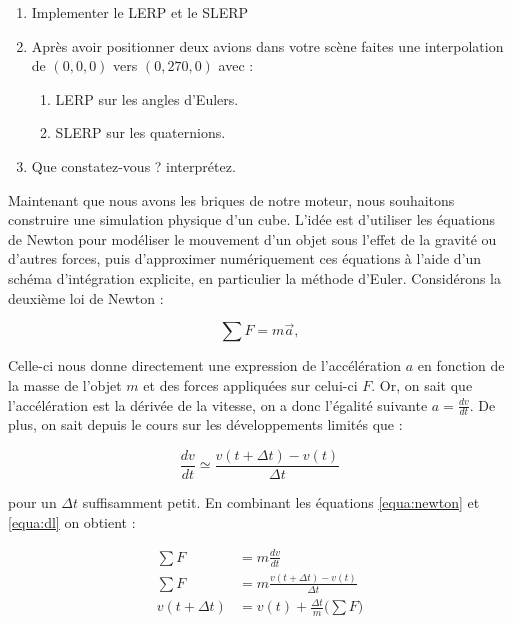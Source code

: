\documentclass[a4paper,12pt]{article}
\begin{document}

\begin{enumerate}
    \item Implementer le LERP et le SLERP
    \item Après avoir positionner deux avions dans votre scène faites une interpolation de $(0,0,0)$ vers $(0,270,0)$ avec :
    \begin{enumerate}
        \item LERP sur les angles d'Eulers.
        \item SLERP sur les quaternions.        
    \end{enumerate}
    \item Que constatez-vous ? interprétez.
\end{enumerate}




Maintenant que nous avons les briques de notre moteur, nous souhaitons construire une simulation physique d'un cube. 
L'idée est d'utiliser les équations de Newton pour modéliser le mouvement d'un objet sous l'effet de la gravité ou d'autres forces, puis d'approximer numériquement ces équations à l'aide d'un schéma d'intégration explicite, en particulier la méthode d'Euler. Considérons la deuxième loi de Newton : 

\begin{equation}
    \label{equa:newton}
    \sum F = m\vec{a},
\end{equation}

Celle-ci nous donne directement une expression de l'accélération $a$ en fonction de la masse de l'objet $m$ et des forces appliquées sur celui-ci $F$. Or, on sait que l'accélération est la dérivée de la vitesse, on a donc l'égalité suivante $a = \frac{dv}{dt}$. De plus, on sait depuis le cours sur les développements limités que :

\begin{equation}
    \label{equa:dl}
    \frac{dv}{dt} \simeq \frac{v(t+\Delta t)-v(t)}{\Delta t}
\end{equation}

pour un $\Delta t$ suffisamment petit. En combinant les équations \eqref{equa:newton} et \eqref{equa:dl} on obtient :

\begin{align}
\sum F &= m \frac{dv}{dt} \\
\sum F &= m \frac{v(t+\Delta t)-v(t)}{\Delta t} \\
v(t+\Delta t) &= v(t) + \frac{\Delta t}{m}\bigl(\sum F\bigr)
\end{align}
\end{document}
